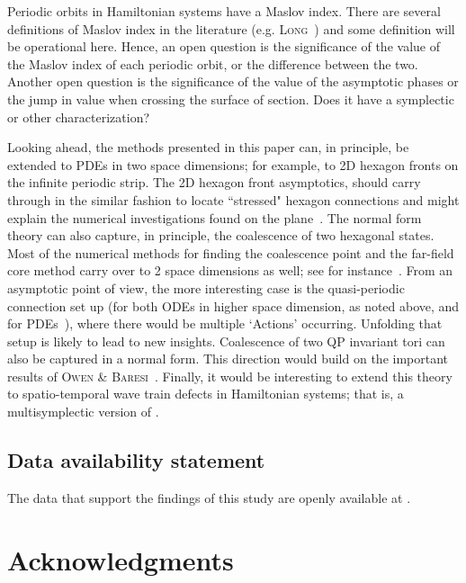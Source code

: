 \documentclass[10pt]{article}
\begin{document}
 Periodic orbits in Hamiltonian systems have a Maslov index.  There are several definitions of Maslov index in the literature (e.g. \textsc{Long}~\cite{long-book}) and some definition will be operational here.  Hence, an open question is the significance of the value of the Maslov index of each periodic orbit, or the difference between the two.  Another open question is the significance of the value of the asymptotic phases or the jump in value when crossing the surface of section.  Does it have a symplectic or other characterization?

 Looking ahead, the methods presented in this paper can, in principle, be extended to PDEs in two space dimensions; for example, to 2D hexagon fronts on the infinite periodic strip. The 2D hexagon front asymptotics, should carry through in the similar fashion to locate ``stressed" hexagon connections and might explain the numerical investigations found on the plane~\cite{Subramanian2021}. The normal form theory can also capture, in principle, the coalescence of two hexagonal states.  Most of the numerical methods for finding the coalescence point and the far-field core method carry over to 2 space dimensions as well; see for instance~\cite{Lloyd2021,Lloyd2017}.  From an asymptotic point of view, the more interesting case is the quasi-periodic connection set up (for both ODEs in higher space dimension, as noted above, and for PDEs~\cite{Subramanian2016}), where there would be multiple `Actions' occurring. Unfolding that setup is likely to lead to new insights. Coalescence of two QP invariant tori can also be captured in a normal form.  This direction would build on the important results of \textsc{Owen \& Baresi}~\cite{ob24}.  Finally, it would be interesting to extend this theory to spatio-temporal wave train defects in Hamiltonian systems; that is, a multisymplectic version of \cite{Sandstede2004,Robert2025}. 

\subsection*{Data availability statement}
The data that support the findings of this study are openly available at \cite{Bridge2026Github}.


\section*{Acknowledgments}
\end{document}
